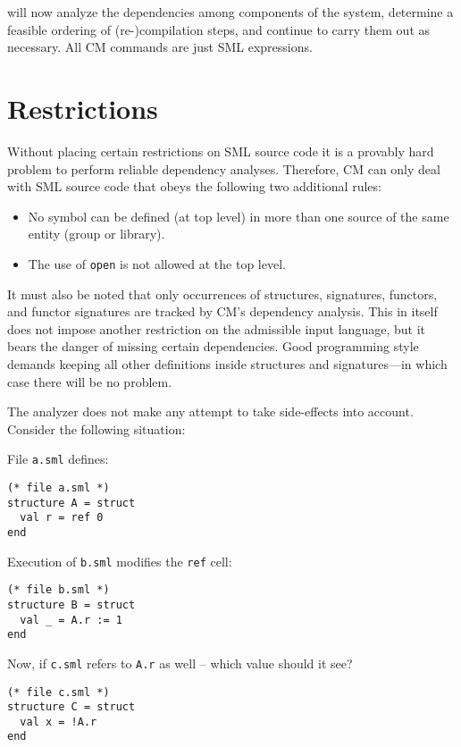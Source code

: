 \documentclass{article}
\begin{document}
will now analyze the dependencies among components of the system,
determine a feasible ordering of (re-)compilation steps, and continue
to carry them out as necessary.  All CM commands are just SML
expressions.

\section{Restrictions}

Without placing certain restrictions on SML source code it is a
provably hard problem to perform reliable dependency analyses.
Therefore, CM can only deal with SML source code that obeys
the following two additional rules:
{\samepage

\begin{itemize}
\item No symbol can be defined (at top level) in more than one source
of the same entity (group or library).
\item The use of {\tt open} is not allowed at the top level.
\end{itemize}
}

It must also be noted that only occurrences of structures, signatures,
functors, and functor signatures are tracked by CM's dependency
analysis.  This in itself does not impose another restriction on the
admissible input language, but it bears the danger of missing certain
dependencies.  Good programming style demands keeping all other
definitions inside structures and signatures---in which case there
will be no problem.

The analyzer does not make any attempt to take side-effects into
account.  Consider the following situation: 

File {\tt a.sml} defines:
\begin{verbatim}
(* file a.sml *)
structure A = struct
  val r = ref 0
end
\end{verbatim}

Execution of {\tt b.sml} modifies the {\tt ref} cell:

\begin{verbatim}
(* file b.sml *)
structure B = struct
  val _ = A.r := 1
end
\end{verbatim}

Now, if {\tt c.sml} refers to {\tt A.r} as well -- which value should
it see?

\begin{verbatim}
(* file c.sml *)
structure C = struct
  val x = !A.r
end
\end{verbatim}
\end{document}
